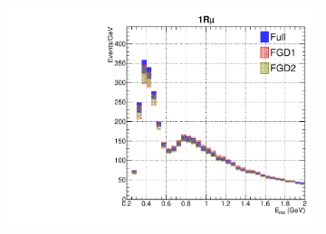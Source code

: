 \begin{figure}[h]
\begin{subfigure}[t]{0.32\textwidth}
	\end{subfigure}
	\begin{subfigure}[t]{0.32\textwidth}
		\includegraphics[width=\textwidth, trim={0mm 0mm 0mm 0mm}, clip, page=3]{figures/mach3/data/alt/try_2017_fit_on_sk_spectra_posterior_sk_error_fgd1only_spectra_posterior_sk_error_fgd2only_spectra}
	\end{subfigure}
	

\end{figure}
